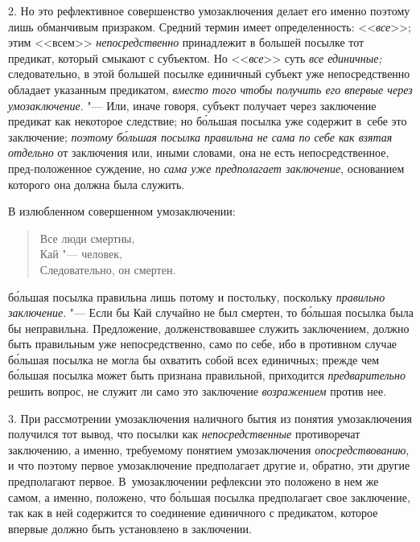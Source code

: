 2. Но это рефлективное совершенство умозаключения делает его
именно поэтому лишь обманчивым призраком. Средний термин имеет
определенность: <<{\em все}>>; этим <<всем>> {\em непосредственно}
принадлежит в большей посылке тот предикат, который смыкают с
субъектом. Но <<{\em все}>> суть {\em все единичные;}
следовательно, в этой большей посылке единичный субъект уже
непосредственно обладает указанным предикатом,
{\em вместо того чтобы получить его
впервые через умозаключение}. "--- Или, иначе говоря, субъект
получает через заключение предикат как некоторое следствие; но б\'{о}льшая
посылка уже содержит в~себе это заключение;
{\em поэтому б\'{о}льшая посылка правильна не сама
по себе как взятая отдельно} от заключения или, иными
словами, она не есть непосредственное, пред-положенное суждение, но
{\em сама уже предполагает заключение},
основанием которого она должна была служить.

В излюбленном совершенном умозаключении:

\begin{verse}
Все люди смертны,\\
Кай "--- человек,\\
Следовательно, он смертен.
\end{verse}

\noindent б\'{о}льшая посылка правильна лишь потому и постольку, поскольку
{\em правильно заключение}. "---
Если бы Кай случайно не был смертен, то б\'{о}льшая посылка была
бы неправильна. Предложение, долженствовавшее служить заключением, должно
быть правильным уже непосредственно, само по себе, ибо в противном случае
б\'{о}льшая посылка не могла бы охватить собой всех единичных; прежде чем
б\'{о}льшая посылка может быть признана правильной, приходится
{\em предварительно} решить вопрос, не служит ли само это заключение
{\em возражением} против нее.

3. При рассмотрении умозаключения наличного бытия из понятия
умозаключения получился тот вывод, что посылки как {\em непосредственные}
противоречат заключению, а именно, требуемому понятием
умозаключения {\em опосредствованию},
и что поэтому первое умозаключение предполагает другие и,
обратно, эти другие предполагают первое. В~умозаключении рефлексии это
положено в нем же самом, а именно, положено, что б\'{о}льшая
посылка предполагает свое заключение, так как в ней содержится то
соединение единичного с предикатом, которое впервые должно быть установлено
в заключении.

